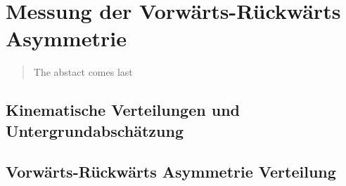 


\chapter{Messung der Vorwärts-Rückwärts Asymmetrie}
\label{afb}

\begin{quote}
    The abstact comes last
\end{quote}






\section{Kinematische Verteilungen und Untergrundabschätzung}
\label{afb:kinematics}







\section{Vorwärts-Rückwärts Asymmetrie Verteilung}
\label{afb:afb}





